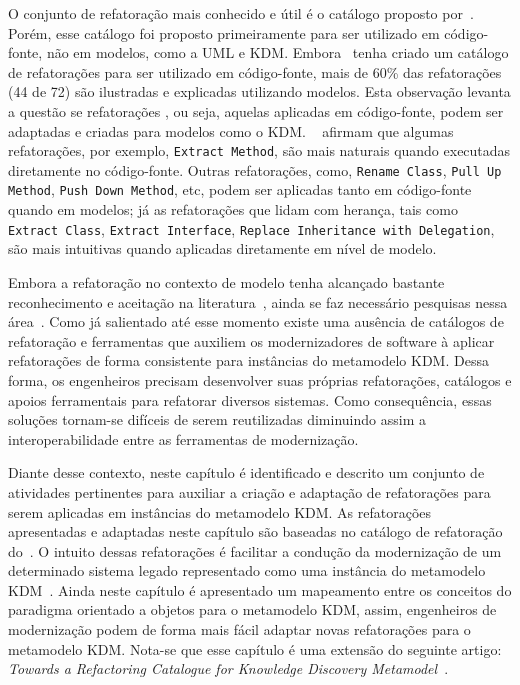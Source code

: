 O conjunto de refatoração mais conhecido e útil é o catálogo proposto por~. Porém, esse catálogo foi proposto primeiramente para ser utilizado em código-fonte, não em modelos, como a UML e KDM. Embora~ tenha criado um catálogo de refatorações para ser utilizado em código-fonte, mais de 60\% das refatorações (44 de 72) são ilustradas e explicadas utilizando modelos. Esta observação levanta a questão se refatorações , ou seja, aquelas aplicadas em código-fonte, podem ser adaptadas e criadas para modelos como o KDM. ~ afirmam que algumas refatorações, por exemplo, \texttt{Extract Method}, são mais naturais quando executadas diretamente no código-fonte. Outras refatorações, como, \texttt{Rename Class}, \texttt{Pull Up Method}, \texttt{Push Down Method}, etc, podem ser aplicadas tanto em código-fonte quando em modelos; já as refatorações que lidam com herança, tais como \texttt{Extract Class}, \texttt{Extract Interface}, \texttt{Replace Inheritance with Delegation}, são mais intuitivas quando aplicadas diretamente em nível de modelo. 

Embora a refatoração no contexto de modelo tenha alcançado bastante reconhecimento e aceitação na literatura~\cite{Moghadam_2012, Maneerat_2011, Fourati_2011, Einarsson_2012, Steimann_2015, Akiyama_2011, Jensen_2010, Arendt_2012, Millan_2009, Tom_2008_2008}, ainda se faz necessário pesquisas nessa área~\cite{durelli_systematic_mapping, revisao_sistematica_uml_refactoring}. Como já salientado até esse momento existe uma ausência de catálogos de refatoração e ferramentas que auxiliem os modernizadores de software à aplicar refatorações de forma consistente para instâncias do metamodelo KDM. Dessa forma, os engenheiros precisam desenvolver suas próprias refatorações, catálogos e apoios ferramentais para refatorar diversos sistemas. Como consequência, essas soluções tornam-se difíceis de serem reutilizadas diminuindo assim a interoperabilidade entre as ferramentas de modernização. 

Diante desse contexto, neste capítulo é identificado e descrito um conjunto de atividades pertinentes para auxiliar a criação e adaptação de refatorações para serem aplicadas em instâncias do metamodelo KDM. As refatorações apresentadas e adaptadas neste capítulo são baseadas no catálogo de refatoração do~. O intuito dessas refatorações é facilitar a condução da modernização de um determinado sistema legado representado como uma instância do metamodelo KDM~\cite{durelli_catalogo, durelli_VEM_ferramenta}. Ainda neste capítulo é apresentado um mapeamento entre os conceitos do paradigma orientado a objetos para o metamodelo KDM, assim, engenheiros de modernização podem de forma mais fácil adaptar novas refatorações para o metamodelo KDM. Nota-se que esse capítulo é uma extensão do seguinte artigo: \textit{Towards a Refactoring Catalogue for Knowledge Discovery Metamodel}~\cite{durelli_catalogo}.

